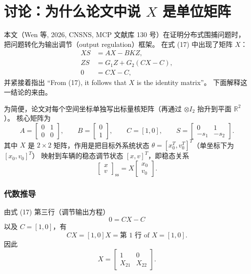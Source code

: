 \section{讨论：为什么论文中说 $X$ 是单位矩阵}

本文（Wen 等, 2026, CNSNS, MCP 文献库 130 号）在证明分布式围捕问题时，
把问题转化为输出调节（output regulation）框架。
在式 (17) 中出现了矩阵 $X$：
\[
\begin{aligned}
XS &= AX - BKZ, \\
ZS &= G_1Z + G_2(CX - C), \\
0  &= CX - C,
\end{aligned}\tag{17}
\]
并紧接着指出 ``From (17), it follows that $X$ is the identity matrix''。
下面解释这一结论的来由。


为简便，论文对每个空间坐标单独写出标量核矩阵（再通过 $\otimes I_2$ 抬升到平面 $\mathbb R^2$）。
核心矩阵为
\[
A=\begin{bmatrix}0&1\\0&0\end{bmatrix},\qquad
B=\begin{bmatrix}0\\1\end{bmatrix},\qquad
C=[1,0],\qquad
S=\begin{bmatrix}0&1\\-s_1&-s_2\end{bmatrix}.
\]
其中 $X$ 是 $2\times 2$ 矩阵，作用是把目标外系统状态
$\theta=[x_0^T, v_0^T]^T$（单坐标下为 $[x_0, v_0]^T$）
映射到车辆的稳态调节状态 $[x, v]^T$，即稳态关系
\[
\begin{bmatrix}x\\ v\end{bmatrix}_{\mathrm{ss}} = X
\begin{bmatrix}x_0\\ v_0\end{bmatrix}.
\]

\subsubsection{代数推导}

由式 (17) 第三行（调节输出方程）
\[
0 = CX - C
\]
以及 $C=[1,0]$，有
\[
CX = [1,0]X = \text{第 1 行 of }X = [1,0].
\]
因此
\[
X = \begin{bmatrix}1&0\\ X_{21}&X_{22}\end{bmatrix}.
\]

